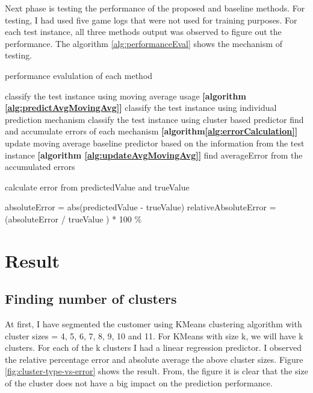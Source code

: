 Next phase is testing the performance of the proposed and baseline methods. For testing, I had used five game logs that were not used for training purposes. For each test instance, all three methods output was observed to figure out the performance. The algorithm \ref{alg:performanceEval} shows the mechanism of testing.

\begin{algorithm}
\caption{performance evalulation of each method}
\begin{algorithmic} [1]
	\STATE classify the test instance using moving average usage \textbf{[algorithm \ref{alg:predictAvgMovingAvg}]}
	\STATE classify the test instance using individual prediction mechanism
	\STATE classify the test instance using cluster based predictor
	\STATE find and accumulate errors of each mechanism \textbf{[algorithm\ref{alg:errorCalculation}]}
	\STATE update moving average baseline predictor based on the information from the test instance \textbf{[algorithm \ref{alg:updateAvgMovingAvg}]}
\ENDFOR 
\STATE find averageError from the accumulated errors
\end{algorithmic}
\label{alg:performanceEval}
\end{algorithm}

\begin{algorithm} [!h]
\caption{calculate error from predictedValue and trueValue}
\begin{algorithmic} [1]
\STATE absoluteError = abs(predictedValue - trueValue)
\STATE relativeAbsoluteError = (absoluteError / trueValue ) * 100 \%
\end{algorithmic}
\label{alg:errorCalculation}
\end{algorithm}

\section{Result}
\subsection{Finding number of clusters}

At first, I have segmented the customer using KMeans clustering algorithm with cluster sizes = 4, 5, 6, 7, 8, 9, 10 and 11. For KMeans with size k, we will have k clusters. For each of the k clusters I had a linear regression predictor. I observed the relative percentage error and absolute average the above cluster sizes. Figure \ref{fig:cluster-type-vs-error} shows the result. From, the figure it is clear that the size of the cluster does not have a big impact on the prediction performance.


